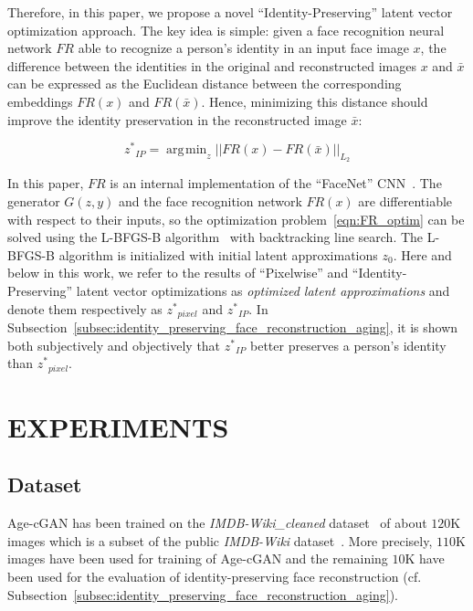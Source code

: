 \documentclass{article}
\DeclareMathOperator*{\argmin}{arg\!min}
\begin{document}
Therefore, in this paper, we propose a novel ``Identity-Preserving'' latent vector optimization approach.
The key idea is simple: given a face recognition neural network $FR$ able to recognize a person's identity in an input face image $x$, the difference between the identities in the original and reconstructed images $x$ and $\bar{x}$ can be expressed as the Euclidean distance between the corresponding embeddings $FR(x)$ and $FR(\bar{x})$.
Hence, minimizing this distance should improve the identity preservation in the reconstructed image $\bar{x}$:

\begin{equation}{z^{*}}_{IP}=\argmin_{z}{||FR(x)-FR(\bar{x})||_{L_{2}}}
	\label{eqn:FR_optim}
\end{equation}

In this paper, $FR$ is an internal implementation of the ``FaceNet'' CNN~\cite{schroff2015facenet}.
The generator $G(z,y)$ and the face recognition network $FR(x)$ are differentiable with respect to their inputs, so the optimization problem~\ref{eqn:FR_optim} can be solved using the L-BFGS-B algorithm~\cite{byrd1995limited} with backtracking line search.
The L-BFGS-B algorithm is initialized with initial latent approximations $z_{0}$.
Here and below in this work, we refer to the results of ``Pixelwise'' and ``Identity-Preserving'' latent vector optimizations as \textit{optimized latent approximations} and denote them respectively as ${z^{*}}_{pixel}$ and ${z^{*}}_{IP}$.
In Subsection~\ref{subsec:identity_preserving_face_reconstruction_aging}, it is shown both subjectively and objectively that ${z^{*}}_{IP}$ better preserves a person's identity than ${z^{*}}_{pixel}$.

\section{EXPERIMENTS}
\label{sec:experiments}

\subsection{Dataset}
\label{subsec:datasets}

Age-cGAN has been trained on the \textit{IMDB-Wiki\_cleaned} dataset~\cite{antipov2016apparent} of about $120$K images which is a subset of the public \textit{IMDB-Wiki} dataset~\cite{rothe2015dex}.
More precisely, $110$K images have been used for training of Age-cGAN and the remaining $10$K have been used for the evaluation of identity-preserving face reconstruction (cf. Subsection~\ref{subsec:identity_preserving_face_reconstruction_aging}).
\end{document}
